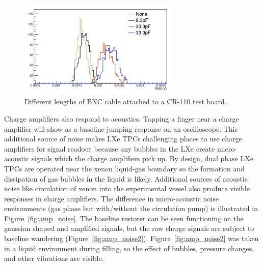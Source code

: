 \begin{figure}[htbp]
\begin{center}
\includegraphics[width=3in]{figures/testbed/rms.png}
\caption{Different lengths of BNC cable attached to a CR-110 test board.}
\label{fig:rms}
\end{center}
\end{figure}

Charge amplifiers also respond to acoustics. Tapping a finger near a charge amplifier will show as a baseline-jumping response on an oscilloscope. This additional source of noise makes \ac{LXe} \ac{TPC}s challenging places to use charge amplifiers for signal readout because any bubbles in the \ac{LXe} create micro-acoustic signals which the charge amplifiers pick up. By design, dual phase \ac{LXe} \ac{TPC}s are operated near the xenon liquid-gas boundary so the formation and dissipation of gas bubbles in the liquid is likely. Additional sources of acoustic noise like circulation of xenon into the experimental vessel also produce visible responses in charge amplifiers. The difference in micro-acoustic noise environments (gas phase but with/without the circulation pump) is illustrated in Figure~\ref{fig:amp_noise}. The baseline restorer can be seen functioning on the gaussian shaped and amplified signals, but the raw charge signals are subject to baseline wandering (Figure~\ref{fig:amp_noise2}). Figure~\ref{fig:amp_noise2} was taken in a liquid environment during filling, so the effect of bubbles, pressure changes, and other vibrations are visible. 

